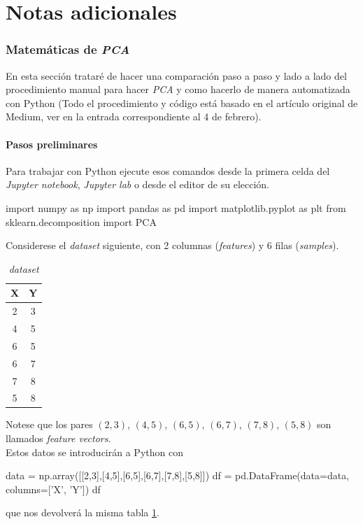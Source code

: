 \newpage%

\part{Notas adicionales} \label{Notas}
\section{Matemáticas de \textit{PCA}}\label{PCAmath}
En esta sección trataré de hacer una comparación paso a paso y lado a lado del procedimiento manual para hacer \textit{PCA} y como hacerlo de manera automatizada con Python (Todo el procedimiento y código está basado en el artículo original de Medium, ver en la entrada correspondiente al 4 de febrero).
\subsection{Pasos preliminares}
Para trabajar con Python ejecute esos comandos desde la primera celda del \textit{Jupyter notebook}, \textit{Jupyter lab} o desde el editor de su elección.
\begin{jupyter}{1}
import numpy as np
import pandas as pd
import matplotlib.pyplot as plt
from sklearn.decomposition import PCA
\end{jupyter}
Considerese el \textit{dataset} siguiente, con 2 columnas (\textit{features}) y 6 filas (\textit{samples}).
\begin{table}[H]
\centering
\begin{tabular}{cc}
\sffamily X & \sffamily Y \\ 
\hline
\rowcolor[HTML]{EFEFEF} 
2 & 3 \\
4 & 5 \\
\rowcolor[HTML]{EFEFEF} 
6 & 5 \\
6 & 7 \\
\rowcolor[HTML]{EFEFEF} 
7 & 8 \\
5 & 8
\end{tabular}
\caption{\textit{dataset}}\label{tab:PCAmath-dataset}
\end{table}
Notese que los pares $(2,3)$, $(4,5)$, $(6,5)$, $(6,7)$, $(7,8)$, $(5,8)$ son llamados \textit{feature vectors}.\\

Estos datos se introducirán a Python con
\begin{jupyter}{2}
data = np.array([[2,3],[4,5],[6,5],[6,7],[7,8],[5,8]])
df = pd.DataFrame(data=data, columns=['X', 'Y'])
df
\end{jupyter}
que nos devolverá la misma tabla \ref{tab:PCAmath-dataset}.


